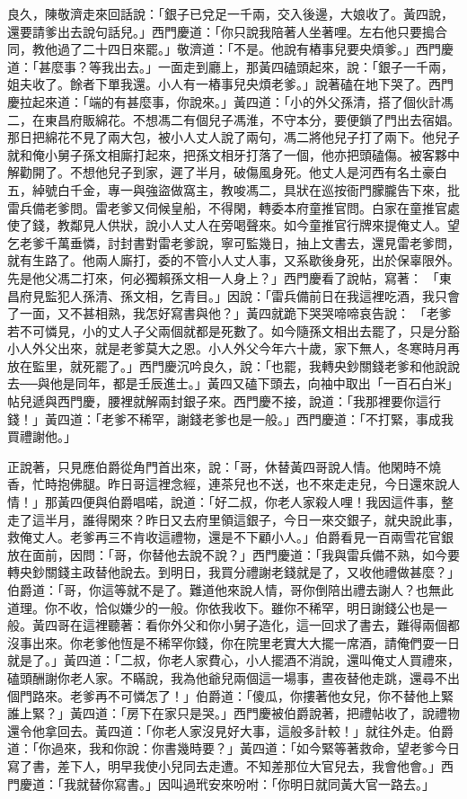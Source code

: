 良久，陳敬濟走來回話說：「銀子已兌足一千兩，交入後邊，大娘收了。黃四說，還要請爹出去說句話兒。」西門慶道：「你只說我陪著人坐著哩。左右他只要搗合同，教他過了二十四日來罷。」敬濟道：「不是。他說有樁事兒要央煩爹。」西門慶道：「甚麼事？等我出去。」一面走到廳上，那黃四磕頭起來，說：「銀子一千兩，姐夫收了。餘者下單我還。小人有一樁事兒央煩老爹。」說著磕在地下哭了。西門慶拉起來道：「端的有甚麼事，你說來。」黃四道：「小的外父孫清，搭了個伙計馮二，在東昌府販綿花。不想馮二有個兒子馮淮，不守本分，要便鎖了門出去宿娼。那日把綿花不見了兩大包，被小人丈人說了兩句，馮二將他兒子打了兩下。他兒子就和俺小舅子孫文相廝打起來，把孫文相牙打落了一個，他亦把頭磕傷。被客夥中解勸開了。不想他兒子到家，遲了半月，破傷風身死。他丈人是河西有名土豪白五，綽號白千金，專一與強盜做窩主，教唆馮二，具狀在巡按衙門朦朧告下來，批雷兵備老爹問。雷老爹又伺候皇船，不得閑，轉委本府童推官問。白家在童推官處使了錢，教鄰見人供狀，說小人丈人在旁喝聲來。如今童推官行牌來提俺丈人。望乞老爹千萬垂憐，討封書對雷老爹說，寧可監幾日，抽上文書去，還見雷老爹問，就有生路了。他兩人廝打，委的不管小人丈人事，又系歇後身死，出於保辜限外。先是他父馮二打來，何必獨賴孫文相一人身上？」西門慶看了說帖，寫著： 「東昌府見監犯人孫清、孫文相，乞青目。」因說：「雷兵備前日在我這裡吃酒，我只會了一面，又不甚相熟，我怎好寫書與他？」黃四就跪下哭哭啼啼哀告說： 「老爹若不可憐見，小的丈人子父兩個就都是死數了。如今隨孫文相出去罷了，只是分豁小人外父出來，就是老爹莫大之恩。小人外父今年六十歲，家下無人，冬寒時月再放在監里，就死罷了。」西門慶沉吟良久，說：「也罷，我轉央鈔關錢老爹和他說說去──與他是同年，都是壬辰進士。」黃四又磕下頭去，向袖中取出「一百石白米」帖兒遞與西門慶，腰裡就解兩封銀子來。西門慶不接，說道：「我那裡要你這行錢！」黃四道：「老爹不稀罕，謝錢老爹也是一般。」西門慶道：「不打緊，事成我買禮謝他。」

正說著，只見應伯爵從角門首出來，說：「哥，休替黃四哥說人情。他閑時不燒香，忙時抱佛腿。昨日哥這裡念經，連茶兒也不送，也不來走走兒，今日還來說人情！」那黃四便與伯爵唱喏，說道：「好二叔，你老人家殺人哩！我因這件事，整走了這半月，誰得閑來？昨日又去府里領這銀子，今日一來交銀子，就央說此事，救俺丈人。老爹再三不肯收這禮物，還是不下顧小人。」伯爵看見一百兩雪花官銀放在面前，因問：「哥，你替他去說不說？」西門慶道：「我與雷兵備不熟，如今要轉央鈔關錢主政替他說去。到明日，我買分禮謝老錢就是了，又收他禮做甚麼？」伯爵道：「哥，你這等就不是了。難道他來說人情，哥你倒陪出禮去謝人？也無此道理。你不收，恰似嫌少的一般。你依我收下。雖你不稀罕，明日謝錢公也是一般。黃四哥在這裡聽著：看你外父和你小舅子造化，這一回求了書去，難得兩個都沒事出來。你老爹他恆是不稀罕你錢，你在院里老實大大擺一席酒，請俺們耍一日就是了。」黃四道：「二叔，你老人家費心，小人擺酒不消說，還叫俺丈人買禮來，磕頭酬謝你老人家。不瞞說，我為他爺兒兩個這一場事，晝夜替他走跳，還尋不出個門路來。老爹再不可憐怎了！」伯爵道：「傻瓜，你摟著他女兒，你不替他上緊誰上緊？」黃四道：「房下在家只是哭。」西門慶被伯爵說著，把禮帖收了，說禮物還令他拿回去。黃四道：「你老人家沒見好大事，這般多計較！」就往外走。伯爵道：「你過來，我和你說：你書幾時要？」黃四道：「如今緊等著救命，望老爹今日寫了書，差下人，明早我使小兒同去走遭。不知差那位大官兒去，我會他會。」西門慶道：「我就替你寫書。」因叫過玳安來吩咐：「你明日就同黃大官一路去。」


